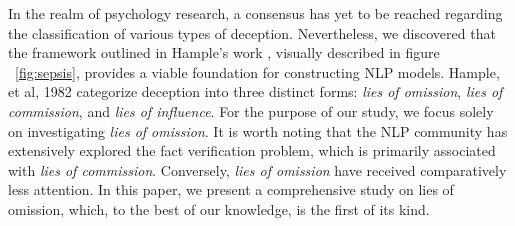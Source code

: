 In the realm of psychology research, a consensus has yet to be reached regarding the classification of various types of deception. Nevertheless, we discovered that the framework outlined in Hample's work \cite{hample1982empirical}, visually described in figure ~\ref{fig:sepsis}, provides a viable foundation for constructing NLP models. 
Hample, et al, 1982 categorize deception into three distinct forms: \emph{lies of omission}, \emph{lies of commission}, and \emph{lies of influence}. For the purpose of our study, we focus solely on investigating \emph{lies of omission}. It is worth noting that the NLP community has extensively explored the fact verification problem, which is primarily associated with \emph{lies of commission}. Conversely, \emph{lies of omission} have received comparatively less attention. In this paper, we present a comprehensive study on lies of omission, which, to the best of our knowledge, is the first of its kind. 

\vspace{-2mm}

